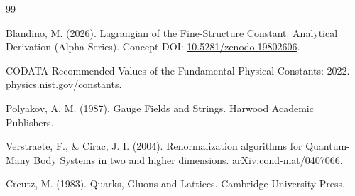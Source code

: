 \documentclass[12pt]{article}
\begin{document}

\begin{thebibliography}{99}

Blandino, M. (2026). Lagrangian of the Fine-Structure Constant: Analytical Derivation (Alpha Series).
Concept DOI: \href{https://doi.org/10.5281/zenodo.19802606}{10.5281/zenodo.19802606}.

CODATA Recommended Values of the Fundamental Physical Constants: 2022.
\href{https://physics.nist.gov/constants}{physics.nist.gov/constants}.

Polyakov, A. M. (1987). Gauge Fields and Strings. Harwood Academic Publishers.

Verstraete, F., \& Cirac, J. I. (2004). Renormalization algorithms for Quantum-Many Body Systems in two and higher dimensions.
arXiv:cond-mat/0407066.

Creutz, M. (1983). Quarks, Gluons and Lattices. Cambridge University Press.

\end{thebibliography}
\end{document}
